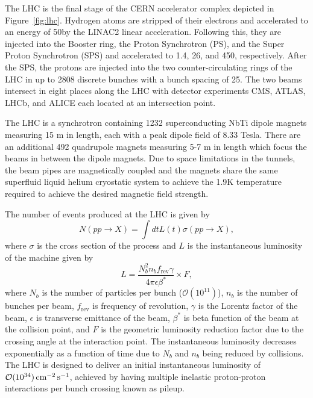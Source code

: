The LHC is the final stage of the CERN accelerator complex depicted in Figure~\ref{fig:lhc}.
Hydrogen atoms are stripped of their electrons and accelerated to an energy of 50\GeV by the LINAC2 linear acceleration.
Following this, they are injected into the Booster ring, the Proton Synchrotron (PS), and the Super Proton Synchrotron (SPS) and accelerated to 1.4, 26, and 450\GeV, respectively.
After the SPS, the protons are injected into the two counter-circulating rings of the LHC in up to 2808 discrete bunches with a bunch spacing of 25\ns.
The two beams intersect in eight places along the LHC with detector experiments CMS, ATLAS, LHCb, and ALICE each located at an intersection point.

The LHC is a synchrotron containing 1232 superconducting NbTi dipole magnets measuring 15 m in length, each with a peak dipole field of 8.33 Tesla. 
There are an additional 492 quadrupole magnets measuring 5-7 m in length which focus the beams in between the dipole magnets.
Due to space limitations in the tunnels, the beam pipes are magnetically coupled and the magnets share the same superfluid liquid helium cryostatic system to achieve the 1.9K temperature required to achieve the desired magnetic field strength.

The number of events produced at the LHC is given by
\begin{equation}
  N(pp \rightarrow X) = \int dt L(t) \sigma(pp \rightarrow X),
\end{equation}
where $\sigma$ is the cross section of the process and $L$ is the instantaneous luminosity of the machine given by
\begin{equation}
  L = \frac{N_b^2 n_b f_{\text{rev}} \gamma}{4 \pi \epsilon \beta^*} \times F,
\end{equation}
where $N_b$ is the number of particles per bunch ($\mathcal{O}(10^{11})$),
$n_b$ is the number of bunches per beam,
$f_{\text{rev}}$ is frequency of revolution,
$\gamma$ is the Lorentz factor of the beam,
$\epsilon$ is transverse emittance of the beam,
$\beta^*$ is beta function of the beam at the collision point,
and $F$ is the geometric luminosity reduction factor due to the crossing angle at the interaction point.
The instantaneous luminosity decreases exponentially as a function of time due to $N_b$ and $n_b$ being reduced by collisions.
The LHC is designed to deliver an initial instantaneous luminosity of $\mathcal{O}(10^{34}) \,\text{cm}^{-2}\,\text{s}^{-1}$, achieved by having multiple inelastic proton-proton interactions per bunch crossing known as pileup.

